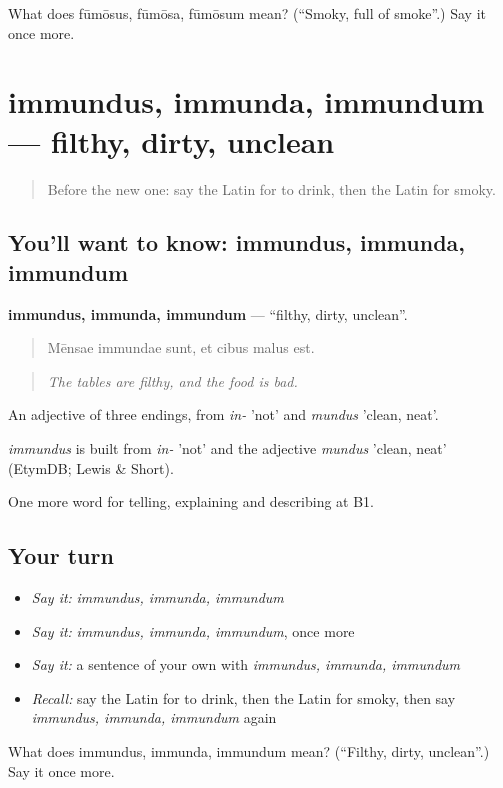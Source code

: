 \begin{tcolorbox}[breakable,colback=teal!4,colframe=teal!35!black,title={Before you move on}]
What does fūmōsus, fūmōsa, fūmōsum mean? (\textquotedblleft{}Smoky, full of smoke\textquotedblright{}.) Say it once more.
\end{tcolorbox}
\section[immundus, immunda, immundum]{immundus, immunda, immundum — filthy, dirty, unclean}

\label{lesson:LA-C461-immundus}



\begin{quote}
Before the new one: say the Latin for to drink, then the Latin for smoky.
\end{quote}

\subsection*{You'll want to know: immundus, immunda, immundum}
\textbf{immundus, immunda, immundum} — \textquotedblleft{}filthy, dirty, unclean\textquotedblright{}.

\begin{quote}
Mēnsae immundae sunt, et cibus malus est.
\end{quote}

\begin{quote}
\emph{The tables are filthy, and the food is bad.}
\end{quote}

An adjective of three endings, from \emph{in-} 'not' and \emph{mundus} 'clean, neat'.

\begin{cousinweb}
\emph{immundus} is built from \emph{in-} 'not' and the adjective \emph{mundus} 'clean, neat' (EtymDB; Lewis \& Short).
\end{cousinweb}

\begin{grammarlens}[title={What you've built}]
One more word for telling, explaining and describing at B1.
\end{grammarlens}

\subsection*{Your turn}
\begin{itemize}
\raggedright
  \item \emph{Say it:} \emph{immundus, immunda, immundum}
  \item \emph{Say it:} \emph{immundus, immunda, immundum}, once more
  \item \emph{Say it:} a sentence of your own with \emph{immundus, immunda, immundum}
  \item \emph{Recall:} say the Latin for to drink, then the Latin for smoky, then say \emph{immundus, immunda, immundum} again
\end{itemize}

\begin{tcolorbox}[breakable,colback=teal!4,colframe=teal!35!black,title={Before you move on}]
What does immundus, immunda, immundum mean? (\textquotedblleft{}Filthy, dirty, unclean\textquotedblright{}.) Say it once more.
\end{tcolorbox}
